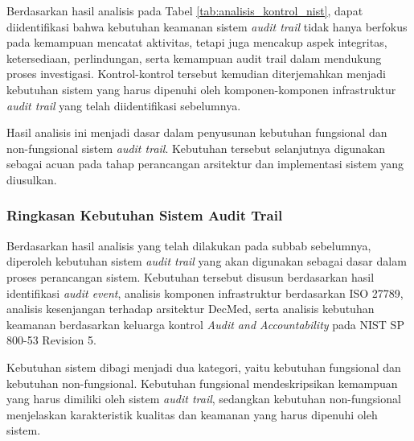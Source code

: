 Berdasarkan hasil analisis pada Tabel \ref{tab:analisis_kontrol_nist}, dapat diidentifikasi bahwa kebutuhan keamanan sistem \textit{audit trail} tidak hanya berfokus pada kemampuan mencatat aktivitas, tetapi juga mencakup aspek integritas, ketersediaan, perlindungan, serta kemampuan audit trail dalam mendukung proses investigasi. Kontrol-kontrol tersebut kemudian diterjemahkan menjadi kebutuhan sistem yang harus dipenuhi oleh komponen-komponen infrastruktur \textit{audit trail} yang telah diidentifikasi sebelumnya.

Hasil analisis ini menjadi dasar dalam penyusunan kebutuhan fungsional dan non-fungsional sistem \textit{audit trail}. Kebutuhan tersebut selanjutnya digunakan sebagai acuan pada tahap perancangan arsitektur dan implementasi sistem yang diusulkan.

\subsubsection{Ringkasan Kebutuhan Sistem Audit Trail}

Berdasarkan hasil analisis yang telah dilakukan pada subbab sebelumnya, diperoleh kebutuhan sistem \textit{audit trail} yang akan digunakan sebagai dasar dalam proses perancangan sistem. Kebutuhan tersebut disusun berdasarkan hasil identifikasi \textit{audit event}, analisis komponen infrastruktur berdasarkan ISO 27789, analisis kesenjangan terhadap arsitektur DecMed, serta analisis kebutuhan keamanan berdasarkan keluarga kontrol \textit{Audit and Accountability} pada NIST SP 800-53 Revision 5.

Kebutuhan sistem dibagi menjadi dua kategori, yaitu kebutuhan fungsional dan kebutuhan non-fungsional. Kebutuhan fungsional mendeskripsikan kemampuan yang harus dimiliki oleh sistem \textit{audit trail}, sedangkan kebutuhan non-fungsional menjelaskan karakteristik kualitas dan keamanan yang harus dipenuhi oleh sistem.

